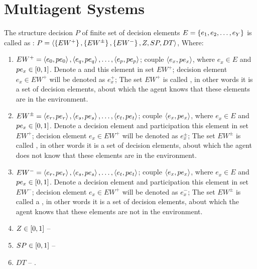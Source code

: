 \chapter{Multiagent Systems}

\begin{defi}
The structure decision $P$ of finite set of decision elements $E=\left\{ e_1,e_2,\ldots,e_Y\right\}$ is called as : $P=\left\langle \left\{ EW^+\right\},\left\{ EW^{\pm}\right\},\left\{ EW^-\right\},Z,SP,DT\right\rangle$, Where:
\begin{enumerate}
 \item $EW^+=\left\langle e_0,pe_0\right\rangle,\left\langle e_q,pe_q\right\rangle,\ldots,\left\langle e_p,pe_p\right\rangle$; couple $\left\langle e_x,pe_x\right\rangle$, where $e_x\in E$ and $pe_x\in\left[0,1\right]$. Denote a  and  this element in set $EW^+$; decision element $e_x\in EW^+$ will be denoted as $e_x^+$; The set $EW^+$ is called , in other words it is a set of decision elements, about which the agent knows that these elements are in the environment.
 \item $EW^{\pm}=\left\langle e_r,pe_r\right\rangle,\left\langle e_s,pe_s\right\rangle,\ldots,\left\langle e_t,pe_t\right\rangle$; couple $\left\langle e_x,pe_x\right\rangle$, where $e_x\in E$ and $pe_x\in\left[0,1\right]$. Denote a decision element and participation this element in set $EW^+$; decision element $e_x\in EW^+$ will be denoted as $e_x^{\pm}$; The set $EW^{\pm}$ is called , in other words it is a set of decision elements, about which the agent does not know that these elements are in the environment.
 \item $EW^-=\left\langle e_r,pe_r\right\rangle,\left\langle e_s,pe_s\right\rangle,\ldots,\left\langle e_t,pe_t\right\rangle$; couple $\left\langle e_x,pe_x\right\rangle$, where $e_x\in E$ and $pe_x\in\left[0,1\right]$. Denote a decision element and participation this element in set $EW^-$; decision element $e_x\in EW^+$ will be denoted as $e_x^-$; The set $EW^{\pm}$ is called a , in other words it is a set of decision elements, about which the agent knows that these elements are not in the environment.
 \item $Z\in\left[0,1\right]$ -- 
 \item $SP\in\left[0,1\right]$ -- 
 \item $DT$ -- .
\end{enumerate}
\cite{conf/fedcsis/Sobieska-KarpinskaH12}
\end{defi}

